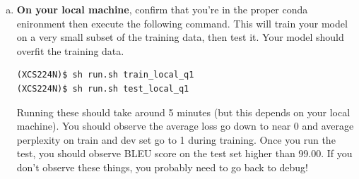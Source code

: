 \begin{enumerate}[(a)]
    \item {} \label{qn:run_tiny_enc} \textbf{On your local machine}, confirm that you're in the proper conda enironment then execute the following command. 
    This will train your model on a very small subset of the training data, then test it. Your model should overfit the training data.
\begin{lstlisting}
(XCS224N)$ sh run.sh train_local_q1
(XCS224N)$ sh run.sh test_local_q1
\end{lstlisting}

    Running these should take around 5 minutes (but this depends on your local machine). 
    You should observe the average loss go down to near 0 and average perplexity on train and dev set go to 1 during training. Once you run the test, you should observe BLEU score on the test set higher than 99.00. 
    If you don't observe these things, you probably need to go back to debug!

\end{enumerate}
